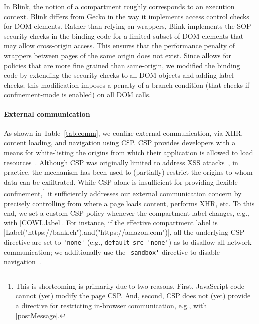 In Blink, the notion of a compartment roughly corresponds to an
execution context.
%
Blink differs from Gecko in the way it implements access control checks for
DOM elements. 
%
Rather than relying on wrappers, Blink implements the SOP
security checks in the binding code for a limited subset of DOM
elements that may allow cross-origin access.
%
This ensures that the performance penalty of wrappers between pages of the same
origin does not exist.
%
Since \sys{} allows for policies that are more fine grained than
same-origin, we modified the binding code by extending the security
checks to all DOM objects and adding label checks; this modification
imposes a penalty of a branch condition (that checks if
confinement-mode is enabled) on all DOM calls.

 
\paragraph{External communication}
%
As shown in Table~\ref{tab:comm}, we confine external communication,
via XHR, content loading, and navigation using CSP\@.
%
CSP provides developers with a
means for white-listing the origins from which their application is
allowed to load resources~\cite{csp}.
%
Although CSP was originally limited to address XSS
attacks~\cite{kerschbaum2007simple}, in practice, the mechanism has
been used to (partially) restrict the origins to whom data can be
exfiltrated.
%
While CSP alone is insufficient for providing flexible
confinement,\footnote{
This is shortcoming is primarily due to two reasons. First,
JavaScript code cannot (yet) modify the page CSP\@.
And, second, CSP does not (yet) provide a directive for restricting 
in-browser communication, e.g., with \js|postMessage|.
}
it sufficiently addresses our external communication concern by
precisely controlling from where a page loads content, performs XHR, etc.
%
To this end, we set a custom CSP policy whenever the compartment label
changes, e.g., with \js|COWL.label|.
%
For instance, if the effective compartment label is
\js|Label("https://bank.ch").and("https://amazon.com")|, all the
underlying CSP directive are set to \verb|'none'| (e.g.,
\verb|default-src 'none'|) as to disallow all network communication;
we additionally use the \verb|'sandbox'| directive to disable
navigation~\cite{csp1.1,whatwg-html,html5}.
%

